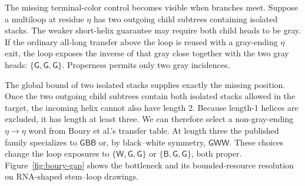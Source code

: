\documentclass[11pt]{article}
\newcommand{\Bcol}{\mathsf{B}}
\newcommand{\Wcol}{\mathsf{W}}
\newcommand{\Gray}{\mathsf{G}}
\begin{document}
The missing terminal-color control becomes visible when branches meet.  Suppose a multiloop at residue $\eta$ has two outgoing child subtrees containing isolated stacks.  The weaker short-helix guarantee may require both child heads to be gray.  If the ordinary all-long transfer above the loop is reused with a gray-ending $\eta$ exit, the loop exposes the inverse of that gray close together with the two gray heads: $\{\Gray,\Gray,\Gray\}$.  Properness permits only two gray incidences.

The global bound of two isolated stacks supplies exactly the missing position.  Once the two outgoing child subtrees contain both isolated stacks allowed in the target, the incoming helix cannot also have length 2.  Because length-1 helices are excluded, it has length at least three.  We can therefore select a non-gray-ending $\eta\to\eta$ word from Boury et al.'s transfer table.  At length three the published family specializes to $\Gray\Bcol\Bcol$ or, by black--white symmetry, $\Gray\Wcol\Wcol$.  These choices change the loop exposures to $\{\Wcol,\Gray,\Gray\}$ or $\{\Bcol,\Gray,\Gray\}$, both proper.  Figure~\ref{fig:boury-gap} shows the bottleneck and its bounded-resource resolution on RNA-shaped stem--loop drawings.
\end{document}
